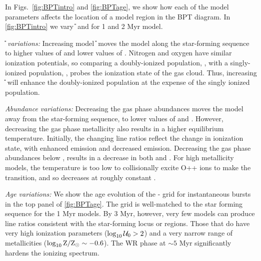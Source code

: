 In Figs.~\ref{fig:BPTintro} and \ref{fig:BPTage}, we show how each of the model parameters affects the location of a model \hii region in the BPT diagram. In \ref{fig:BPTintro} we vary \U{} and \logz{} for 1 and 2 Myr model.

{\it \U{} variations:} Increasing model \U{} moves the model along the star-forming sequence to higher values of \oiiihb{} and lower values of \niiha{}. Nitrogen and oxygen have similar ionization potentials, so comparing a doubly-ionized population, \oiii{}, with a singly-ionized population, \nii{}, probes the ionization state of the gas cloud. Thus, increasing \U{} will enhance the doubly-ionized population at the expense of the singly ionized population.

{\it Abundance variations:} Decreasing the gas phase abundances moves the model away from the star-forming sequence, to lower values of \niiha{} and \oiiihb{}. However, decreasing the gas phase metallicity also results in a higher equilibrium temperature. Initially, the changing line ratios reflect the change in ionization state, with enhanced \oiii{} emission and decreased \nii{} emission. Decreasing the gas phase abundances below ,  results in a decrease in both \oiiihb{} and \niiha{}. For high metallicity models, the temperature is too low to collisionally excite O++ ions to make the \oiii{} transition, and so \oiiihb{} decreases at roughly constant \niiha{}.

{\it Age variations:} We show the age evolution of the \logz{}-\logU{} grid for instantaneous bursts in the top panel of \ref{fig:BPTage}. The grid is well-matched to the star forming sequence for the 1 Myr models. By 3 Myr, however, very few models can produce line ratios consistent with the star-forming locus or \hii regions. Those that do have very high ionization parameters ($\log_{10} \mathcal{U}_0 > 2$) and a very narrow range of metallicities ($\log_{10} \mathrm{Z}/\mathrm{Z}_{\odot} \sim -0.6$). The WR phase at $\sim5$ Myr significantly hardens the ionizing spectrum.

